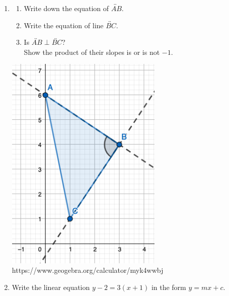 \begin{enumerate}
\item \begin{multicols}{2}
  \begin{enumerate}
    \item Write down the equation of $\overleftrightarrow{AB}$.
    \item Write the equation of line $\overleftrightarrow{BC}$.
    \item Is $\overleftrightarrow{AB} \perp \overleftrightarrow{BC}$? \\[1cm]
    Show the product of their slopes is or is not $-1$. \\[3cm]
    \end{enumerate}
\columnbreak
    \includegraphics[width=7.5cm]{../graphics/06triangle.png}
    https://www.geogebra.org/calculator/myk4wwbj
\end{multicols}

\item Write the linear equation $y-2=3(x+1)$ in the form $y=mx+c$. \vspace{4cm}


\end{enumerate}
